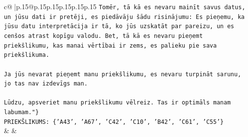 \documentclass{article}
\begin{document}
{\begin{supertabular}{c@{$\;$}|p{.15\linewidth}@{}p{.15\linewidth}p{.15\linewidth}p{.15\linewidth}p{.15\linewidth}p{.15\linewidth}}
{{{\texttt{Tomēr, tā kā es nevaru mainīt savus datus, un jūsu dati ir pretēji, es piedāvāju šādu risinājumu: Es pieņemu, ka jūsu datu interpretācija ir tā, ko jūs uzskatāt par pareizu, un es cenšos atrast kopīgu valodu. Bet, tā kā es nevaru pieņemt priekšlikumu, kas manai vērtībai ir zems, es palieku pie sava priekšlikuma.} \\
\\ 
\texttt{Ja jūs nevarat pieņemt manu priekšlikumu, es nevaru turpināt sarunu, jo tas nav izdevīgs man.} \\
\\ 
\texttt{Lūdzu, apsveriet manu priekšlikumu vēlreiz. Tas ir optimāls manam labumam."\}} \\
\texttt{PRIEKŠLIKUMS: \{'A43', 'A67', 'C42', 'C10', 'B42', 'C61', 'C55'\}} \\
            }
        }
    }
    & & \\ \\


\end{supertabular}}
\end{document}
